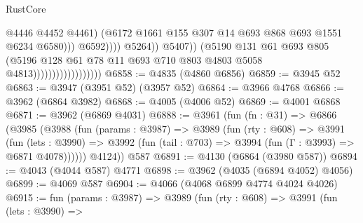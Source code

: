 \begin{lexlean}{RustCore}
\begin{coremodule}
                                                          @4446
                                                          @4452
                                                          @4461)
                                                        (@6172
                                                          @1661
                                                          @155
                                                          @307
                                                          @14
                                                          @693
                                                          @868
                                                          @693
                                                          @1551
                                                          @6234
                                                          @6580)))
                                                    @6592))))
                                            @5264))
                                        @5407))
                                    (@5190
                                      @131
                                      @61
                                      @693
                                      @805
                                      (@5196
                                        @128
                                        @61
                                        @78
                                        @11
                                        @693
                                        @710
                                        @803
                                        @4803
                                        @5058
                                        @4813))))))))))))))))))
@6858 := @4835 (@4860 @6856)
@6859 := @3945 @52
@6863 := @3947 (@3951 @52) (@3957 @52)
@6864 := @3966 @4768
@6866 := @3962 (@6864 @3982)
@6868 := @4005 (@4006 @52)
@6869 := @4001 @6868
@6871 := @3962 (@6869 @4031)
@6888 := @3961
    (fun (fn : @31) =>
    @6866
      (@3985
        (@3988
          (fun (params : @3987) =>
          @3989
            (fun (rty : @608) =>
            @3991
              (fun (lets : @3990) =>
              @3992 (fun (tail : @703) => @3994 (fun (Γ : @3993) => @6871 @4078))))))
        @4124))
    @587
@6891 := @4130 (@6864 (@3980 @587))
@6894 := @4043 (@4044 @587) @4771
@6898 := @3962 (@4035 (@6894 @4052) @4056)
@6899 := @4069 @587
@6904 := @4066 (@4068 @6899 @4774 @4024 @4026)
@6915 := fun (params : @3987) =>
  @3989
    (fun (rty : @608) =>
    @3991
      (fun (lets : @3990) =>

\end{coremodule}
\end{lexlean}
